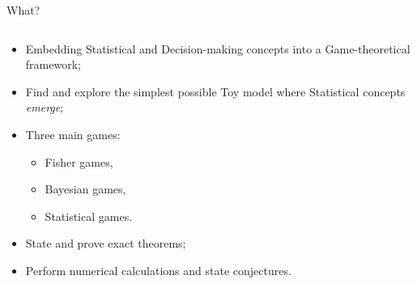 \documentclass{beamer}
\theoremstyle{definition}
\begin{document}
\begin{frame}{What?}



\begin{columns}

\begin{column}{0.7\textwidth}
            
\begin{itemize}
    \item Embedding Statistical and Decision-making concepts into a Game-theoretical framework;
    \item Find and explore the simplest possible Toy model where Statistical concepts \emph{emerge};
    \item Three main games:
    \begin{itemize}
        \item Fisher games,
        \item Bayesian games,
        \item Statistical games.
    \end{itemize}
    \item State and prove exact theorems;
    \item Perform numerical calculations and state conjectures.
\end{itemize}

\end{column}


\end{columns}
\end{frame}
\end{document}
